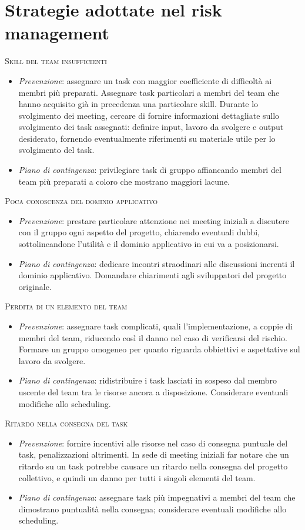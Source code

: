 \section{Strategie adottate nel risk management}
\textsc{Skill del team insufficienti}
\begin{itemize}
\item \textit{Prevenzione}: assegnare un task con maggior coefficiente di difficoltà ai membri più preparati. Assegnare task particolari a membri del team che hanno acquisito già in precedenza una particolare skill. Durante lo svolgimento dei meeting, cercare di fornire informazioni dettagliate sullo svolgimento dei task assegnati: definire input, lavoro da svolgere e output desiderato, fornendo eventualmente riferimenti su materiale utile per lo svolgimento del task.
\item \textit{Piano di contingenza}: privilegiare task di gruppo affiancando membri del team più preparati a coloro che mostrano maggiori lacune.
\end{itemize}
\textsc{Poca conoscenza del dominio applicativo}
\begin{itemize}
\item \textit{Prevenzione}: prestare particolare attenzione nei meeting iniziali a discutere con il gruppo ogni aspetto del progetto, chiarendo eventuali dubbi, sottolineandone l'utilità e il dominio applicativo in cui va a posizionarsi. 
\item \textit{Piano di contingenza}: dedicare incontri straodinari alle discussioni inerenti il dominio applicativo. Domandare chiarimenti agli sviluppatori del progetto originale.
\end{itemize}
\textsc{Perdita di un elemento del team}
\begin{itemize}
\item \textit{Prevenzione}: assegnare task complicati, quali l'implementazione, a coppie di membri del team, riducendo così il danno nel caso di verificarsi del rischio. Formare un gruppo omogeneo per quanto riguarda obbiettivi e aspettative sul lavoro da svolgere.
\item \textit{Piano di contingenza}: ridistribuire i task lasciati in sospeso dal membro uscente del team tra le risorse ancora a disposizione. Considerare eventuali modifiche allo scheduling.  
\end{itemize}
\textsc{Ritardo nella consegna del task}
\begin{itemize}
\item \textit{Prevenzione}: fornire incentivi alle risorse nel caso di consegna puntuale del task, penalizzazioni altrimenti. In sede di meeting iniziali far notare che un ritardo su un task potrebbe causare un ritardo nella consegna del progetto collettivo, e quindi un danno per tutti i singoli elementi del team.
\item \textit{Piano di contingenza}: assegnare task più impegnativi a membri del team che dimostrano puntualità nella consegna; considerare eventuali modifiche allo scheduling.
\end{itemize}
